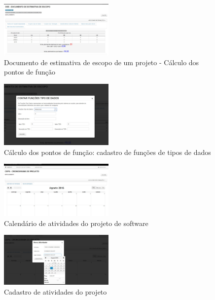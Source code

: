 \documentclass{acm_proc_article-sp}
\begin{document}
\begin{appendices}
\begin{figure}[h]
\centering %
\includegraphics[width=0.5\textwidth]{RF_documento_de_estimativa_de_escopo.jpg} %
\caption{Documento de estimativa de escopo de um projeto - Cálculo dos pontos de função}
\end{figure}

\begin{figure}[h]
\centering %
\includegraphics[width=0.5\textwidth]{RF_funcoes_tipos_de_dados_estimativa_de_escopo.jpg} %
\caption{Cálculo dos pontos de função: cadastro de funções de tipos de dados}
\end{figure}

\begin{figure}[h]
\centering %
\includegraphics[width=0.5\textwidth]{RF_quadro_de_atividades_do_projeto.jpg} %
\caption{Calendário de atividades do projeto de software}
\end{figure}

\begin{figure}[h]
\centering %
\includegraphics[width=0.5\textwidth]{RF_cadastr_de_atividade_para_projeto.jpg} %
\caption{Cadastro de atividades do projeto}
\end{figure}


\end{appendices}
\end{document}
